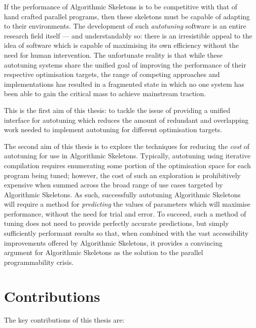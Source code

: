 
If the performance of Algorithmic Skeletons is to be competitive with
that of hand crafted parallel programs, then these skeletons must be
capable of adapting to their environments. The development of such
\emph{autotuning} software is an entire research field itself --- and
understandably so: there is an irresistible appeal to the idea of
software which is capable of maximising its own efficiency without the
need for human intervention. The unfortunate reality is that while
these autotuning systems share the unified goal of improving the
performance of their respective optimisation targets, the range of
competing approaches and implementations has resulted in a fragmented
state in which no one system has been able to gain the critical mass
to achieve mainstream traction.

This is the first aim of this thesis: to tackle the issue of providing
a unified interface for autotuning which reduces the amount of
redundant and overlapping work needed to implement autotuning for
different optimisation targets.


The second aim of this thesis is to explore the techniques for
reducing the \emph{cost} of autotuning for use in Algorithmic
Skeletons. Typically, autotuning using iterative compilation requires
enumerating some portion of the optimisation space for each program
being tuned; however, the cost of such an exploration is prohibitively
expensive when summed across the broad range of use cases targeted by
Algorithmic Skeletons. As such, successfully autotuning Algorithmic
Skeletons will require a method for \emph{predicting} the values of
parameters which will maximise performance, without the need for trial
and error. To succeed, such a method of tuning does not need to
provide perfectly accurate predictions, but simply sufficiently
performant results so that, when combined with the vast accessibility
improvements offered by Algorithmic Skeletons, it provides a
convincing argument for Algorithmic Skeletons as the solution to the
parallel programmability crisis.


\section{Contributions}

The key contributions of this thesis are:

